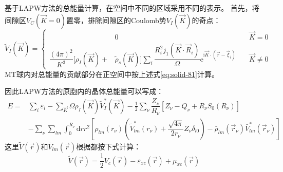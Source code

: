 基于\textrm{LAPW}方法的总能量计算，在空间中不同的区域采用不同的表示。%
首先，将间隙区$V_C(\vec K=0)$置零，排除间隙区的\textrm{Coulomb}势$V_I(\vec K)$的奇点：
\begin{equation}
	\tilde V_I(\vec K)=\left\{
	\begin{aligned}
		&0 \qquad &\vec K=0 \\
		\dfrac{(4\pi)^2}{K^3}\big[\rho_I(\vec K)+&\tilde\rho_s(\vec K)\big]\sum_i\dfrac{R_i^2j_1(\vec K\cdot\vec R_i)}{\Omega}\mathrm{e}^{\mathrm{i}\vec K\cdot(\vec r-\vec\xi_i)}\quad &\vec K\neq0
	\end{aligned}\right.
	\label{eq_Vcou_KI_theta_2}
\end{equation}
\textrm{MT}球内对总能量的贡献部分在正空间中按上述式\eqref{eq:solid-81}计算。

因此\textrm{LAPW}方法的原胞内的晶体总能量可以写成：
\begin{equation}
  \begin{split}
	  E=&\sum_i\varepsilon_i-\sum_{\vec K}\Omega\rho_I(\vec K)\tilde V_I^{\ast}(\vec K)-\frac12\sum_{\nu}\dfrac{Z_{\nu}}{R_{\nu}}[Z_{\nu}-Q_{\nu}+R_{\nu}S_0(R_{\nu})]\\
    &-\sum_{\nu}\sum_{lm}\int_0^{R_{\nu}}\mathrm{d}rr^2\left[\rho_{lm}(r_{\nu})\left(\tilde V_{lm}^{\ast}(r_{\nu})+\dfrac{\sqrt{4\pi}}{2r_{\nu}}Z_{\nu}\delta_{l0}\right)-\bar\rho_{lm}(\vec r_{\nu})\bar V_{lm}^{\ast}(\vec r_{\nu})\right]
  \end{split}
  \label{eq:solid-83}
\end{equation}
这里$\tilde V(\vec r)$和$\bar V_{lm}(\vec r)$根据都按下式计算：
$$\tilde V(\vec r)=\frac12V_c(\vec r)-\varepsilon_{xc}(\vec r)+\mu_{xc}(\vec r)$$

